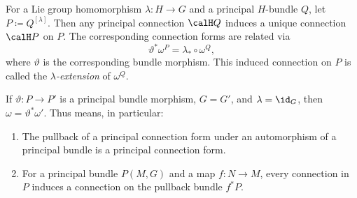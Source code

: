 \begin{cor}[{{\cite[Cor.~1.3.14]{RS2}}}]\label{cor 1.3.14 RS2}
    For a Lie group homomorphism $\lambda:H\to G$ and a principal $H$-bundle $Q$, let $P\coloneqq Q^{[\lambda]}$. Then any principal connection $\calH Q$ induces a unique connection $\calH P$ on $P$. The corresponding connection forms are related via
    \[\vartheta^\ast\omega^P=\lambda_\ast\circ \omega^Q,\]
    where $\vartheta$ is the corresponding bundle morphism. This induced connection on $P$ is called the \emph{$\lambda$-extension} of $\omega^Q$.
\end{cor}

\begin{cor}[{{\cite[Cor.~1.3.16]{RS2}}}]\label{cor 1.3.16 RS2}
    If $\vartheta:P\to P'$ is a principal bundle morphism, $G=G'$, and $\lambda=\id_G$, then $\omega=\vartheta^\ast\omega'$. Thus means, in particular:
    \begin{enumerate}
        \item The pullback of a principal connection form under an automorphism of a principal bundle is a principal connection form.
        \item For a principal bundle $P(M,G)$ and a map $f:N\to M$, every connection in $P$ induces a connection on the pullback bundle $f^\ast P$.
    \end{enumerate}
\end{cor}


